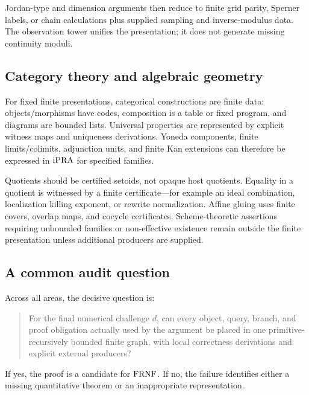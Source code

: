 Jordan-type and dimension arguments then reduce to finite grid parity, Sperner labels,
or chain calculations plus supplied sampling and inverse-modulus data.  The observation
tower unifies the presentation; it does not generate missing continuity moduli.

\subsection{Category theory and algebraic geometry}

For fixed finite presentations, categorical constructions are finite data:
objects/morphisms have codes, composition is a table or fixed program, and diagrams are
bounded lists.  Universal properties are represented by explicit witness maps and
uniqueness derivations.  Yoneda components, finite limits/colimits, adjunction units,
and finite Kan extensions can therefore be expressed in \(\mathrm{iPRA}\) for specified
families.

Quotients should be certified setoids, not opaque host quotients.  Equality in a
quotient is witnessed by a finite certificate---for example an ideal combination,
localization killing exponent, or rewrite normalization.  Affine gluing uses finite
covers, overlap maps, and cocycle certificates.  Scheme-theoretic assertions requiring
unbounded families or non-effective existence remain outside the finite presentation
unless additional producers are supplied.

\subsection{A common audit question}

Across all areas, the decisive question is:

\begin{quote}
For the final numerical challenge \(d\), can every object, query, branch, and proof
obligation actually used by the argument be placed in one primitive-recursively bounded
finite graph, with local correctness derivations and explicit external producers?
\end{quote}

If yes, the proof is a candidate for \(\mathrm{FRNF}\).  If no, the failure identifies either a
missing quantitative theorem or an inappropriate representation.
